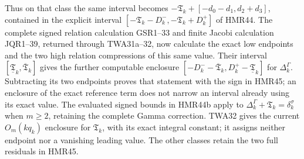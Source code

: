 Thus on that class the same interval becomes
$-\mathfrak T_k+[-d_0-d_1,d_2+d_3]$, contained in the
explicit interval $[-\mathfrak T_k-D_k^-,
-\mathfrak T_k+D_k^+]$ of HMR44. The complete signed
relation calculation GSR1--33 and finite Jacobi calculation
JQR1--39, returned through TWA31a--32, now calculate the
exact low endpoints and the two high relation compressions
of this same value. Their interval
$[\underline{\mathfrak T}_k,\overline{\mathfrak T}_k]$
gives the further computable enclosure
$[-D_k^--\overline{\mathfrak T}_k,
D_k^+-\underline{\mathfrak T}_k]$ for $\Delta_k^\Gamma$.
Subtracting its two endpoints proves that statement with
the sign in HMR45; an enclosure of the exact reference term
does not narrow an interval already using its exact value.
The evaluated signed bounds in HMR44b apply to
$\Delta_k^\Gamma+\mathfrak T_k=\delta_k^\sigma$ when
$m\geq2$, retaining the complete Gamma correction.
TWA32 gives the current $O_m(kq_k)$ enclosure for
$\mathfrak T_k$, with its exact integral constant; it assigns
neither endpoint nor a vanishing leading value.
The other classes retain the two full residuals in HMR45.